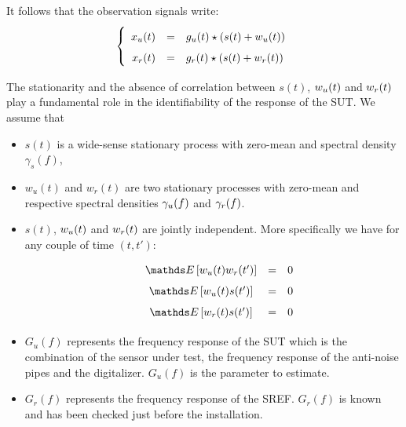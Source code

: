 It follows that the observation signals write:
\begin{eqnarray}
\label{eq:model-of-obervation}
\left\{
\renewcommand\arraystretch{1.6}
\begin{array}{rcl}
x_{\ut}(t)&=&g_{\ut} (t)\star(s(t)+w_{\ut}(t))
\\
x_{\rf}(t)&=&g_{\rf}(t) \star (s(t)+w_{\rf}(t))
\end{array}
\right.
\end{eqnarray}

The stationarity and the absence of correlation between $s(t)$, $w_{{u}}(t)$ and $w_{{r}}(t)$ play a fundamental  role in the identifiability of the response of the SUT. We assume that
\begin{itemize}
\item
$s(t)$ is a wide-sense stationary process with zero-mean and spectral density $\gamma_{s}(f)$,
\item
$w_{u}(t)$ and $w_{r}(t)$ are two  stationary processes with zero-mean and respective spectral densities $\gamma_{{u}}(f)$ and $\gamma_{{r}}(f)$. 
\item
$s(t)$,  $w_{{u}}(t)$ and $w_{{r}}(t)$ are jointly independent. More specifically we have for any couple of time $(t,t')$:
\begin{eqnarray*}
\begin{array}{lccr}
 &\esp{w_{\ut}(t)w_{r}(t')}&=&0
 \\
& \esp{w_{\ut}(t)s(t')}&=&0
 \\
& \esp{w_{\rf}(t)s(t')}&=&0
\end{array}
 \end{eqnarray*}
\item
$G_{u}(f)$ represents the frequency response of the SUT which is the combination of the sensor under test, the frequency response of the anti-noise pipes and the digitalizer. $G_{u}(f)$ is the parameter to estimate.
\item
$G_{r}(f)$ represents the frequency response of the SREF. $G_{r}(f)$ is known and has been checked just before the installation.
\end{itemize}

